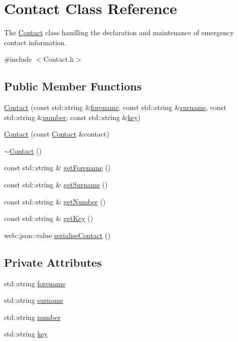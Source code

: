 \hypertarget{class_contact}{}\section{Contact Class Reference}
\label{class_contact}


The \hyperlink{class_contact}{Contact} class handling the declaration and maintenance of emergency contact information.  




{\ttfamily \#include $<$Contact.\+h$>$}

\subsection*{Public Member Functions}
\begin{DoxyCompactItemize}
\item 
\hyperlink{class_contact_a7851a082367f1d01b04b3f8467b9751c}{Contact} (const std\+::string \&\hyperlink{class_contact_af64e25f3271abad7970293e6adfdf457}{forename}, const std\+::string \&\hyperlink{class_contact_a22518b332de3bd09ed94eb4d9de54894}{surname}, const std\+::string \&\hyperlink{class_contact_abd24eed27b661da4ab20553443212437}{number}, const std\+::string \&\hyperlink{class_contact_a5bc7925e6356e29c9cbad7266f0a4340}{key})
\item 
\hyperlink{class_contact_a9657abb8a68839149c8d928b4c16a82c}{Contact} (const \hyperlink{class_contact}{Contact} \&contact)
\item 
\hyperlink{class_contact_ab68013cc59e3d640735c573e52c35219}{$\sim$\+Contact} ()
\item 
const std\+::string \& \hyperlink{class_contact_a2a2311964fe1a1e48ff41f4ddf355c60}{get\+Forename} ()
\item 
const std\+::string \& \hyperlink{class_contact_aba3d4900ea3173f38b7f296536226bb9}{get\+Surname} ()
\item 
const std\+::string \& \hyperlink{class_contact_a612095b153e05538c32400c4c44cb1aa}{get\+Number} ()
\item 
const std\+::string \& \hyperlink{class_contact_a9be97218caf5efd7dabe2b237d85a22f}{get\+Key} ()
\item 
web\+::json\+::value \hyperlink{class_contact_ae52f56140bbde46dd30cb90dd6cfba4f}{serialise\+Contact} ()
\end{DoxyCompactItemize}
\subsection*{Private Attributes}
\begin{DoxyCompactItemize}
\item 
std\+::string \hyperlink{class_contact_af64e25f3271abad7970293e6adfdf457}{forename}
\item 
std\+::string \hyperlink{class_contact_a22518b332de3bd09ed94eb4d9de54894}{surname}
\item 
std\+::string \hyperlink{class_contact_abd24eed27b661da4ab20553443212437}{number}
\item 
std\+::string \hyperlink{class_contact_a5bc7925e6356e29c9cbad7266f0a4340}{key}
\end{DoxyCompactItemize}


